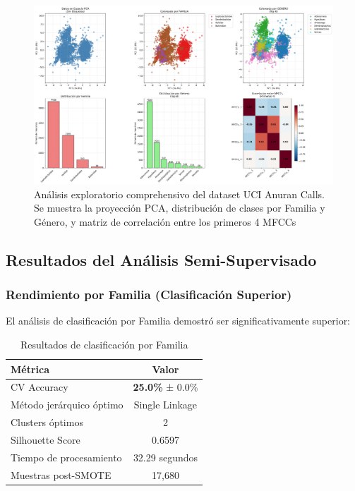 \documentclass[12pt,a4paper]{article}
\begin{document}
\begin{figure}[H]
    \centering
    \includegraphics[width=\textwidth]{figures/figura_04_analisis_anuran.png}
    \caption{Análisis exploratorio comprehensivo del dataset UCI Anuran Calls. Se muestra la proyección PCA, distribución de clases por Familia y Género, y matriz de correlación entre los primeros 4 MFCCs}
    \label{fig:analisis_anuran}
\end{figure}

\subsection{Resultados del Análisis Semi-Supervisado}

\subsubsection{Rendimiento por Familia (Clasificación Superior)}
El análisis de clasificación por Familia demostró ser significativamente superior:

\begin{table}[H]
\centering
\begin{tabular}{|l|c|}
\hline
\textbf{Métrica} & \textbf{Valor} \\
\hline
CV Accuracy & \textbf{25.0\%} ± 0.0\% \\
Método jerárquico óptimo & Single Linkage \\
Clusters óptimos & 2 \\
Silhouette Score & 0.6597 \\
Tiempo de procesamiento & 32.29 segundos \\
Muestras post-SMOTE & 17,680 \\
\hline
\end{tabular}
\caption{Resultados de clasificación por Familia}
\end{table}
\end{document}
